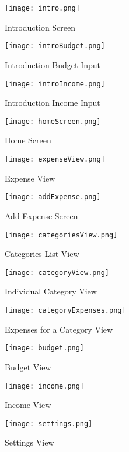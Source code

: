 \begin{figure}
  \caption{Introduction Screen}
  \centering
  \texttt{[image: intro.png]}
\end{figure}

\begin{figure}
  \caption{Introduction Budget Input}
  \centering
  \texttt{[image: introBudget.png]}
\end{figure}

\begin{figure}
  \caption{Introduction Income Input}
  \centering
  \texttt{[image: introIncome.png]}
\end{figure}

\begin{figure}
  \caption{Home Screen}
  \centering
  \texttt{[image: homeScreen.png]}
\end{figure}

\begin{figure}
  \caption{Expense View}
  \centering
  \texttt{[image: expenseView.png]}
\end{figure}

\begin{figure}
  \caption{Add Expense Screen}
  \centering
  \texttt{[image: addExpense.png]}
\end{figure}

\begin{figure}
  \caption{Categories List View}
  \centering
  \texttt{[image: categoriesView.png]}
\end{figure}

\begin{figure}
  \caption{Individual Category View}
  \centering
  \texttt{[image: categoryView.png]}
\end{figure}

\begin{figure}
  \caption{Expenses for a Category View}
  \centering
  \texttt{[image: categoryExpenses.png]}
\end{figure}

\begin{figure}
  \caption{Budget View}
  \centering
  \texttt{[image: budget.png]}
\end{figure}

\begin{figure}
  \caption{Income View}
  \centering
  \texttt{[image: income.png]}
\end{figure}

\begin{figure}
  \caption{Settings View}
  \centering
  \texttt{[image: settings.png]}
\end{figure}
